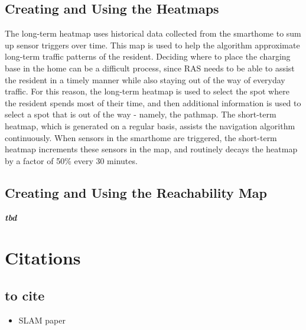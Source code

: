 \documentclass[11pt, conference, a4paper]{IEEEtran}
\begin{document}
\subsection{Creating and Using the Heatmaps}
The long-term heatmap uses historical data collected from the smarthome to sum up sensor triggers over time. This map is used to help the algorithm approximate long-term traffic patterns of the resident. Deciding where to place the charging base in the home can be a difficult process, since RAS needs to be able to assist the resident in a timely manner while also staying out of the way of everyday traffic. For this reason, the long-term heatmap is used to select the spot where the resident spends most of their time, and then additional information is used to select a spot that is out of the way - namely, the pathmap. 
The short-term heatmap, which is generated on a regular basis, assists the navigation algorithm continuously. When sensors in the smarthome are triggered, the short-term heatmap increments these sensors in the map, and routinely decays the heatmap by a factor of 50\% every 30 minutes. 

\subsection{Creating and Using the Reachability Map}
\textit{\textbf{tbd}} 

\section{Citations}
\subsection{to cite}
\begin{itemize}
    \item SLAM paper
\end{itemize}
\end{document}
